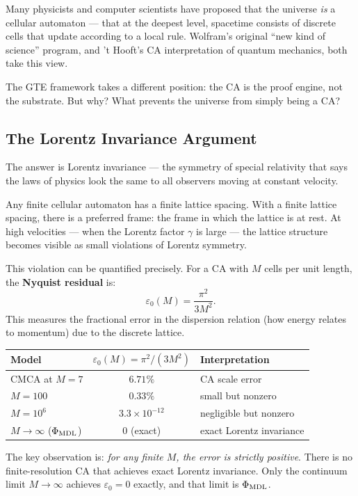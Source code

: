\documentclass[11pt,a4paper]{article}
\newcommand{\term}[1]{\textbf{#1}}
\newcommand{\PhiMDL}{\Phi_{\rm MDL}}
\theoremstyle{definition}
\begin{document}
Many physicists and computer scientists have proposed that the universe \emph{is} a
cellular automaton --- that at the deepest level, spacetime consists of discrete
cells that update according to a local rule.
Wolfram's original ``new kind of science'' program, and 't Hooft's CA interpretation
of quantum mechanics, both take this view.

\medskip
The GTE framework takes a different position: the CA is the proof engine, not the
substrate.  But why?  What prevents the universe from simply being a CA?

\subsection{The Lorentz Invariance Argument}

The answer is Lorentz invariance --- the symmetry of special relativity that says
the laws of physics look the same to all observers moving at constant velocity.

Any finite cellular automaton has a finite lattice spacing.  With a finite lattice
spacing, there is a preferred frame: the frame in which the lattice is at rest.
At high velocities --- when the Lorentz factor $\gamma$ is large --- the lattice
structure becomes visible as small violations of Lorentz symmetry.

This violation can be quantified precisely.  For a CA with $M$ cells per unit
length, the \term{Nyquist residual} is:
\[
  \varepsilon_0(M) = \frac{\pi^2}{3M^2}.
\]
This measures the fractional error in the dispersion relation (how energy relates
to momentum) due to the discrete lattice.

\begin{center}
\begin{tabular}{@{}lcl@{}}
\toprule
\textbf{Model} & $\varepsilon_0(M) = \pi^2/(3M^2)$ & \textbf{Interpretation} \\
\midrule
CMCA at $M = 7$ & $6.71\%$ & CA scale error \\
$M = 100$ & $0.33\%$ & small but nonzero \\
$M = 10^6$ & $3.3 \times 10^{-12}$ & negligible but nonzero \\
$M \to \infty$ ($\PhiMDL$) & $0$ (exact) & exact Lorentz invariance \\
\bottomrule
\end{tabular}
\end{center}

\bigskip
\noindent
The key observation is: \emph{for any finite $M$, the error is strictly positive}.
There is no finite-resolution CA that achieves exact Lorentz invariance.
Only the continuum limit $M \to \infty$ achieves $\varepsilon_0 = 0$ exactly, and
that limit is $\PhiMDL$.
\end{document}
